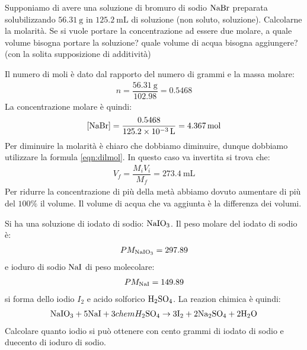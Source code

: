 \documentclass[../AppuntiChimica]{subfiles}
\begin{document}
	\begin{exe}
		Supponiamo di avere una soluzione di bromuro di sodio $ \text{NaBr} $ preparata solubilizzando $ \SI{56.31}{\gram} $ in $ \SI{125.2}{\milli\liter} $ di soluzione (non soluto, soluzione). Calcolarne la molarità. Se si vuole portare la concentrazione ad essere due molare, a quale volume bisogna portare la soluzione? quale volume di acqua bisogna aggiungere? (con la solita supposizione di additività)
	\end{exe}
	\begin{svol}
		Il numero di moli è dato dal rapporto del numero di grammi e la massa molare:
		\begin{gather*}
			n=\dfrac{\SI{56.31}{\gram}}{102.98}=0.5468
		\end{gather*}
		La concentrazione molare è quindi:
		\begin{gather*}
		\left[\text{NaBr}\right]=\dfrac{0.5468}{\SI{125.2e-3}{\liter}}=\SI{4.367}{\mole}
		\end{gather*}
		Per diminuire la molarità è chiaro che dobbiamo diminuire, dunque dobbiamo utilizzare la formula \ref{eqn:dilmol}. In questo caso va invertita si trova che:
		\begin{gather*}
		V_{f}=\dfrac{M_{i}V_{i}}{M_{f}}=\SI{273.4}{\milli\liter}
		\end{gather*}
		Per ridurre la concentrazione di più della metà abbiamo dovuto aumentare di più del $ 100\% $ il volume. Il volume di acqua che va aggiunta è la differenza dei volumi.
	\end{svol}
	\begin{exe}
		Si ha una soluzione di iodato di sodio: $ \text{NaIO}_{3} $. Il peso molare del iodato di sodio è:
		\begin{gather*}
			PM_{\text{NaIO}_{3}}=297.89
		\end{gather*}
		e ioduro di sodio $ \text{NaI} $ di peso molecolare:
		\begin{gather*}
			PM_{\text{NaI}}=149.89
		\end{gather*}
		si forma dello iodio $ I_{2} $ e acido solforico $ \text{H}_{2}\text{SO}_{4} $. La reazion chimica è quindi:
		\begin{gather*}
			\text{NaIO}_{3}+5\text{NaI}+3chem{H}_{2}\text{SO}_{4} \to 3\text{I}_{2}+2 \text{Na}_{2}\text{SO}_{4}+ 2\text{H}_{2}\text{O}
		\end{gather*}
		Calcolare quanto iodio si può ottenere con cento grammi di iodato di sodio e duecento di ioduro di sodio.
	\end{exe}
\end{document}
